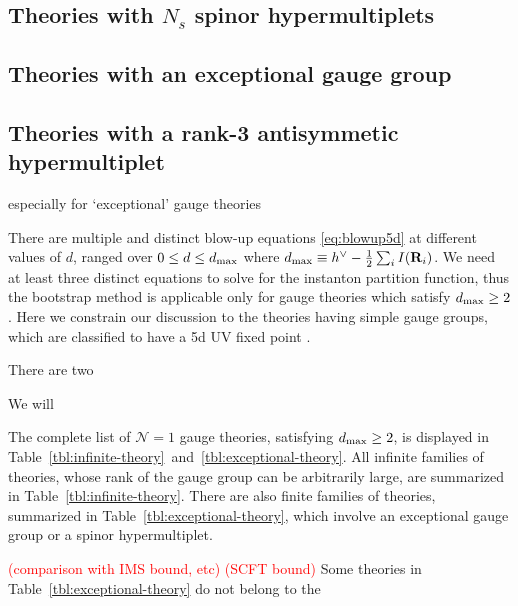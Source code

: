 \documentclass[letterpaper, 11pt]{article}
\begin{document}
{\subsection{Theories with $N_s$ spinor hypermultiplets}
\subsection{Theories with an exceptional gauge group}
\subsection{Theories with a rank-3 antisymmetic hypermultiplet}






especially for `exceptional' gauge theories 



There are multiple and distinct blow-up equations \eqref{eq:blowup5d} at different values of $d$, ranged over $0 \leq d \leq d_{\rm max}$ where $d_{\rm max} \equiv h^\vee 
- \frac{1}{2}\sum_{i} I(\mathbf{R}_i)$. We need at least three distinct equations to solve for the instanton partition function, thus the bootstrap method is applicable only for gauge theories which satisfy $d_{\rm max} \geq 2$. Here we constrain our discussion to the theories having simple gauge groups, which are classified to have a 5d UV fixed point \cite{Jefferson:2017ahm}. 


There are two 




We will 



The complete list of $\mathcal{N}=1$ gauge theories, satisfying $d_{\rm max} \geq 2$, is displayed in Table~\ref{tbl:infinite-theory}~and~\ref{tbl:exceptional-theory}.
All infinite families of theories, whose rank of the gauge group can be arbitrarily large, are summarized in Table~\ref{tbl:infinite-theory}. There are also finite families of theories, summarized in Table~\ref{tbl:exceptional-theory}, which involve an exceptional gauge group or a spinor hypermultiplet. 

\textcolor{red}{(comparison with IMS bound, etc) (SCFT bound)} 
Some theories in Table~\ref{tbl:exceptional-theory} do not belong to the 

}
\end{document}
